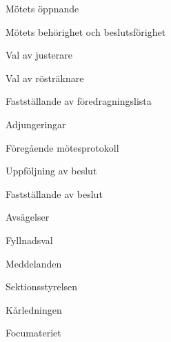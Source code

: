 \documentclass[prelim]{sektionsmote}
\begin{document}
\maketitle

\begin{ootd}

\item{Mötets öppnande}

\item{Mötets behörighet och beslutsförighet}

\item{Val av justerare}

\item{Val av rösträknare}

\item{Fastställande av föredragningslista}

\item{Adjungeringar}

\item{Föregående mötesprotokoll}

\item{Uppföljning av beslut}

\item{Fastställande av beslut}
\begin{ootd}
    \item Avsägelser
    \item Fyllnadsval
\end{ootd}

\item{Meddelanden}
\begin{ootd}
    \item Sektionsstyrelsen
    \item Kårledningen
    \item Focumateriet
\end{ootd}



\end{ootd}
\end{document}
